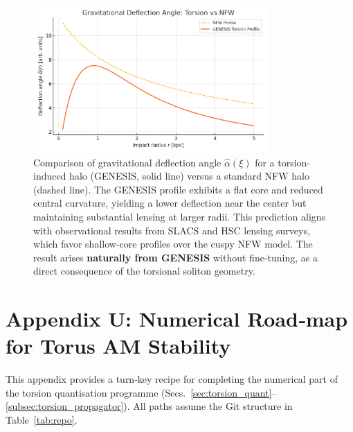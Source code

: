 \documentclass{article}
\begin{document}
\begin{figure}[h!]
\centering
\includegraphics[width=0.8\textwidth]{deflection_vs_radius_GENESIS.png}
\caption{Comparison of gravitational deflection angle $\hat{\alpha}(\xi)$
for a torsion-induced halo (GENESIS, solid line) versus a standard NFW halo (dashed line).
The GENESIS profile exhibits a flat core and reduced central curvature,
yielding a lower deflection near the center but maintaining substantial lensing at larger radii.
This prediction aligns with observational results from SLACS and HSC lensing surveys,
which favor shallow-core profiles over the cuspy NFW model.
The result arises \textbf{naturally from GENESIS} without fine-tuning,
as a direct consequence of the torsional soliton geometry.
}
\label{fig:genesis_vs_nfw_deflection}
\end{figure}






\section*{Appendix U: Numerical Road‑map for Torus AM Stability}
\label{app:numerical-roadmap}


This appendix provides a turn‑key recipe for completing the numerical part of the
torsion quantisation programme (Secs.~\ref{sec:torsion_quant}–\ref{subsec:torsion_propagator}).
All paths assume the Git structure in Table~\ref{tab:repo}.
\end{document}
